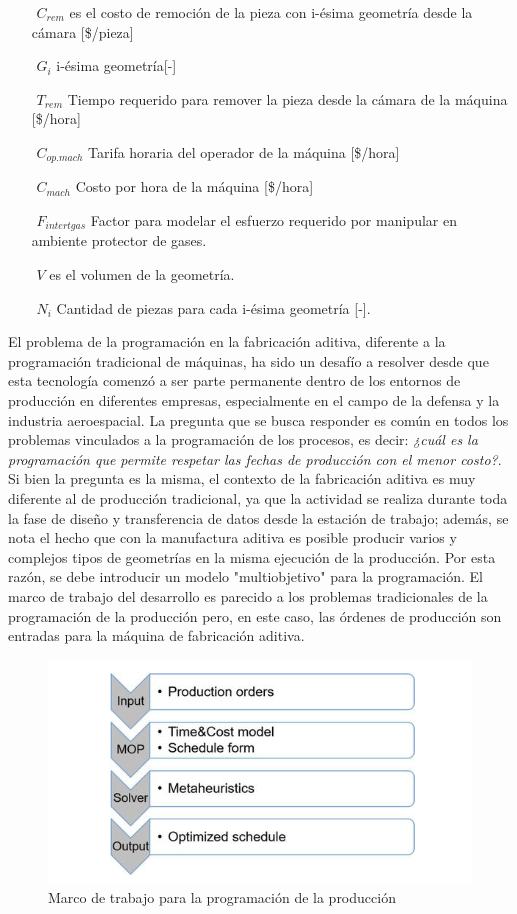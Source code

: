 \begin{description}
\begin{itemize}
\item[$ $] $C_{rem} $ es el costo de remoción de la pieza con i-ésima geometría desde la cámara [\$/pieza]
\item[$ $] $G_i $ i-ésima geometría[-]
\item[$ $] $T_{rem} $ Tiempo requerido para remover la pieza desde la cámara de la máquina [\$/hora]
\item[$ $] $C_{op.mach} $ Tarifa horaria del operador de la máquina [\$/hora]
\item[$ $] $C_{mach} $ Costo por hora de la máquina [\$/hora]
\item[$ $] $F_{intertgas} $ Factor para modelar el esfuerzo requerido por manipular en ambiente protector de gases.
\item[$ $] $V $ es el volumen de la geometría.
\item[$ $] $N_i$ Cantidad de piezas para cada i-ésima geometría [-].
\end{itemize}

El problema de la programación en la fabricación aditiva, diferente a la programación tradicional de máquinas, ha sido un desafío a resolver desde que esta tecnología comenzó a ser parte permanente dentro de los entornos de producción en diferentes empresas, especialmente en el campo de la defensa y la industria aeroespacial. La pregunta que se busca responder es común en todos los problemas vinculados a la programación de los procesos, es decir: \textit{¿cuál es la programación que permite respetar las fechas de producción con el menor costo?}.
Si bien la pregunta es la misma, el contexto de la fabricación aditiva es muy diferente al de producción tradicional, ya que la actividad se realiza durante toda la fase de diseño y transferencia de datos desde la estación de trabajo; además, se nota el hecho que con la manufactura aditiva es posible producir varios y complejos tipos de geometrías en la misma ejecución de la producción. Por esta razón, se debe introducir un modelo "multiobjetivo" para la programación.
El marco de trabajo del desarrollo es parecido a los problemas tradicionales de la programación de la producción pero, en este caso, las órdenes de producción son entradas para la máquina de fabricación aditiva.
\begin{figure}[H]
\centering
\includegraphics[scale=0.8]{images/mapaproduccion.png} 
\caption{Marco de trabajo para la programación de la producción \citep{fera2018}}
\end{figure}


\end{description}
